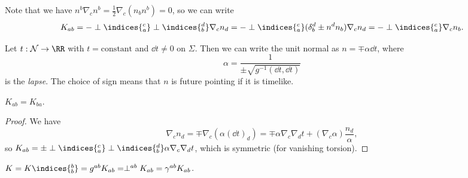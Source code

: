 \documentclass{jknotes}
\begin{document}
Note that we have \(n^b\nabla_cn^b = \frac12\nabla_c(n_bn^b) = 0\), so we can write
\begin{equation}
    K_{ab} = -\perp\indices{^c_a}\perp\indices{^d_b}\nabla_cn_d = -\perp\indices{^c_a}(\delta^d_b\pm n^dn_b)\nabla_c n_d = -\perp\indices{^c_a}\nabla_c n_b.
\end{equation}
\begin{defn}
    Let \(t:\mathcal{N}\to\RR\) with \(t=\text{constant}\) and \(\dd{t}\ne 0\) on \(\Sigma\). Then we can write the unit normal as \(n = \mp \alpha\dd{t}\), where 
    \begin{equation}
        \alpha = \frac1{\pm\sqrt{g^{-1}(\dd{t},\dd{t})}}
    \end{equation}
    is the \emph{lapse}. The choice of sign means that \(n\) is future pointing if it is timelike.
\end{defn}

\begin{lemma}
    \(K_{ab} = K_{ba}\).
\end{lemma}
\begin{proof}
    We have
    \begin{equation}
        \nabla_cn_d = \mp\nabla_c(\alpha(\dd{t})_d) = \mp \alpha\nabla_c\nabla_d t + (\nabla_c\alpha) \frac{n_d}{\alpha},
    \end{equation}
    so \(K_{ab} = \pm \perp\indices{^c_a}\perp\indices{^d_b}\alpha\nabla_c\nabla_d t\), which is symmetric (for vanishing torsion).
\end{proof}

\begin{defn}
    \(K = K\indices{^b_b} = g^{ab}K_{ab} = \perp^{ab}K_{ab} = \gamma^{ab}K_{ab}\).
\end{defn}
\end{document}
